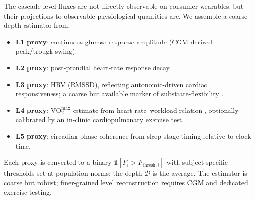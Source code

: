 \documentclass[11pt,twocolumn,a4paper]{article}
\theoremstyle{definition}
\theoremstyle{remark}
\newcommand{\Dhier}{\mathcal{D}}
\begin{document}
The cascade-level fluxes are not directly observable on consumer
wearables, but their projections to observable physiological
quantities are. We assemble a coarse depth estimator from:
\begin{itemize}[leftmargin=*]
\item \textbf{L1 proxy}: continuous glucose response amplitude
(CGM-derived peak/trough swing).
\item \textbf{L2 proxy}: post-prandial heart-rate response decay.
\item \textbf{L3 proxy}: HRV (RMSSD), reflecting autonomic-driven
cardiac responsiveness; a coarse but available marker of
substrate-flexibility \citep{shaffer2017}.
\item \textbf{L4 proxy}: $\mathrm{VO}_2^{\max}$ estimate from
heart-rate--workload relation \citep{wasserman2011}, optionally
calibrated by an in-clinic cardiopulmonary exercise test.
\item \textbf{L5 proxy}: circadian phase coherence from sleep-stage
timing relative to clock time.
\end{itemize}

Each proxy is converted to a binary $\mathbb{1}[F_i > F_{\mathrm{thresh},i}]$
with subject-specific thresholds set at population norms; the depth
$\Dhier$ is the average. The estimator is coarse but robust;
finer-grained level reconstruction requires CGM and dedicated
exercise testing.
\end{document}
